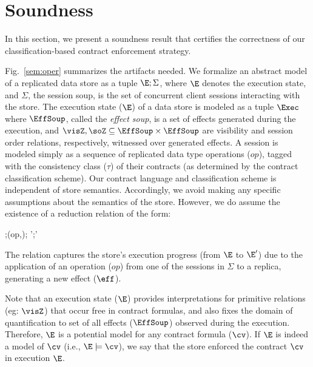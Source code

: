 \section{Soundness}
\label{sec:core-opsem}

In this section, we present a soundness result that certifies
the correctness of our classification-based contract enforcement
strategy.

Fig.~\ref{sem:oper} summarizes the artifacts needed. We formalize an
abstract model of a replicated data store as a tuple $\E;\Sigma$, where $\E$
denotes the execution state, and $\Sigma$, the session soup, is the set of
concurrent client sessions interacting with the store. The execution state
($\E$) of a data store is modeled as a tuple $\Exec$ where $\EffSoup$,
called the \emph{effect soup}, is a set of effects generated during the
execution, and $\visZ,\soZ \subseteq \EffSoup \times \EffSoup$ are
visibility and session order relations, respectively, witnessed over
generated effects. A session is modeled simply as a sequence of replicated
data type operations ($op$), tagged with the consistency class ($\tau$) of
their contracts (as determined by the contract classification scheme). Our
contract language and classification scheme is independent of store
semantics. Accordingly, we avoid making any specific assumptions about the
semantics of the store. However, we do assume the existence of a reduction
relation of the form:

\begin{smathpar}
  \auxred{} {\E;\langle (op,\tau);\sigma \rangle \pll \Sigma} {\eff}
    {\E';\langle \sigma \rangle \pll \Sigma'}
\end{smathpar}

\noindent The relation captures the store's execution progress (from
$\E$ to $\E'$) due to the application of an operation ($op$) from one
of the sessions in $\Sigma$ to a replica, generating a new effect
($\eff$).

Note that an execution state ($\E$) provides interpretations for
primitive relations (eg: $\visZ$) that occur free in contract
formulas, and also fixes the domain of quantification to set of all
effects ($\EffSoup$) observed during the execution. Therefore, $\E$ is
a potential model for any contract formula ($\cv$). If $\E$ is indeed
a model of $\cv$ (i.e., $\E \models \cv$), we say that the store
enforced the contract $\cv$ in execution $\E$.

